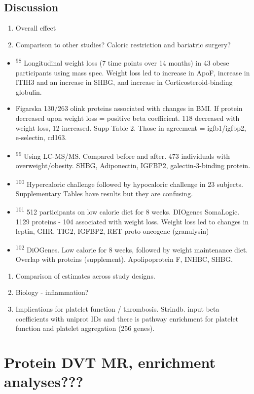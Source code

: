 \documentclass[11pt,twoside]{bristolthesis}
\providecommand{\tightlist}{%
  \setlength{\itemsep}{0pt}\setlength{\parskip}{0pt}}
\begin{document}
\hypertarget{discussion-4}{%
\section{Discussion}\label{discussion-4}}
\begin{enumerate}
\def\labelenumi{\arabic{enumi}.}
\tightlist
\item
  Overall effect
\item
  Comparison to other studies? Caloric restriction and bariatric surgery?
\end{enumerate}
\begin{itemize}
\tightlist
\item
  \textsuperscript{98} Longitudinal weight loss (7 time points over 14 months) in 43 obese participants using mass spec. Weight loss led to increase in ApoF, increase in ITIH3 and an increase in SHBG, and increase in Corticosteroid-binding globulin.
\item
  Figarska 130/263 olink proteins associated with changes in BMI. If protein decreased upon weight loss = positive beta coefficient. 118 decreased with weight loss, 12 increased. Supp Table 2. Those in agreement = igfb1/igfbp2, e-selectin, cd163.
\item
  \textsuperscript{99} Using LC-MS/MS. Compared before and after. 473 individuals with overweight/obesity. SHBG, Adiponectin, IGFBP2, galectin-3-binding protein.\\
\item
  \textsuperscript{100} Hypercaloric challenge followed by hypocaloric challenge in 23 subjects. Supplementary Tables have results but they are confusing.
\item
  \textsuperscript{101} 512 participants on low calorie diet for 8 weeks. DIOgenes SomaLogic. 1129 proteins - 104 associated with weight loss. Weight loss led to changes in leptin, GHR, TIG2, IGFBP2, RET proto-oncogene (granulysin)
\item
  \textsuperscript{102} DiOGenes. Low calorie for 8 weeks, followed by weight maintenance diet. Overlap with proteins (supplement). Apolipoprotein F, INHBC, SHBG.
\end{itemize}
\begin{enumerate}
\def\labelenumi{\arabic{enumi}.}
\setcounter{enumi}{2}
\tightlist
\item
  Comparison of estimates across study designs.
\item
  Biology - inflammation?
\item
  Implications for platelet function / thrombosis. Strindb. input beta coefficients with uniprot IDs and there is pathway enrichment for platelet function and platelet aggregation (256 genes).
\end{enumerate}
\hypertarget{protein-dvt-mr-enrichment-analyses}{%
\chapter{Protein DVT MR, enrichment analyses???}\label{protein-dvt-mr-enrichment-analyses}}
\end{document}
